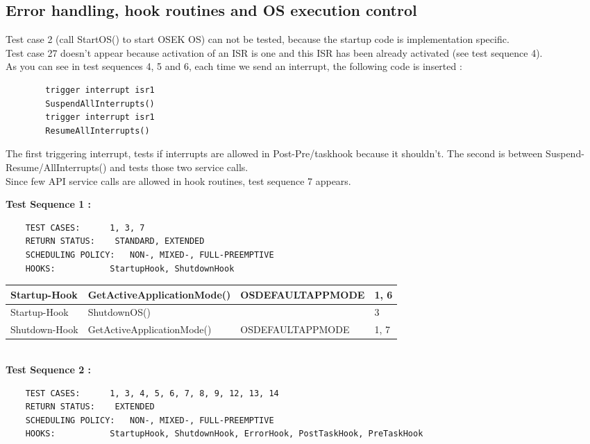 \documentclass[10pt]{article}
\newlength{\Li}\settowidth{\Li}{Running}
\newlength{\Lii}\setlength{\Lii}{7cm}
\newlength{\Liiii}\setlength{\Liiii}{0.9cm}
\newlength{\Liii}\setlength{\Liii}{\textwidth} \addtolength{\Liii}{-\Li} \addtolength{\Liii}{-\Lii} \addtolength{\Liii}{-\Liiii}
\begin{document}
\subsection{Error handling, hook routines and OS execution control}
	Test case 2 (call StartOS() to start OSEK OS) can not be tested, because the startup code is implementation specific. \\
	Test case 27 doesn't appear because activation of an ISR is one and this ISR has been already activated (see test sequence 4).\\
	As you can see in test sequences 4, 5 and 6, each time we send an interrupt, the following code is inserted :
	\begin{lstlisting}
		trigger interrupt isr1
		SuspendAllInterrupts()	
		trigger interrupt isr1
		ResumeAllInterrupts()
	\end{lstlisting}
	The first triggering interrupt, tests if interrupts are allowed in Post-Pre/taskhook because it shouldn't. The second is between Suspend-Resume/AllInterrupts() and tests those two service calls.\\	
	Since few API service calls are allowed in hook routines, test sequence 7 appears.\\
	
\settowidth{\Li}{PostTask-Hook}
\setlength{\Lii}{6cm}	
\setlength{\Liii}{\textwidth} \addtolength{\Liii}{-\Li} \addtolength{\Liii}{-\Lii} \addtolength{\Liii}{-\Liiii}

	\textbf{Test Sequence 1 :}
	\begin{lstlisting}
	TEST CASES:		 1, 3, 7
	RETURN STATUS:	  STANDARD, EXTENDED
	SCHEDULING POLICY:   NON-, MIXED-, FULL-PREEMPTIVE
	HOOKS:			 StartupHook, ShutdownHook
	\end{lstlisting}
	
	
	\begin{supertabular}{|p{\Li}|p{\Lii}|p{\Liii}|p{\Liiii}|} \hline 
	Startup-Hook		& GetActiveApplicationMode()			& OSDEFAULTAPPMODE	& 1, 6 \\ \hline
	Startup-Hook		& ShutdownOS()					& 						& 3 \\ \hline
	Shutdown-Hook	& GetActiveApplicationMode()			& OSDEFAULTAPPMODE	& 1, 7\\ \hline
	\end{supertabular}\\
	
	\textbf{Test Sequence 2 :}
	\begin{lstlisting}
	TEST CASES:		 1, 3, 4, 5, 6, 7, 8, 9, 12, 13, 14
	RETURN STATUS:	  EXTENDED
	SCHEDULING POLICY:   NON-, MIXED-, FULL-PREEMPTIVE
	HOOKS:			 StartupHook, ShutdownHook, ErrorHook, PostTaskHook, PreTaskHook
	\end{lstlisting}
	
	
\end{document}
